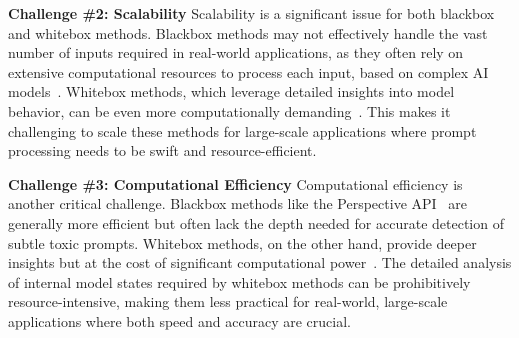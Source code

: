 



\textbf{Challenge \#2: Scalability} Scalability is a significant issue for both blackbox and whitebox methods. Blackbox methods may not effectively handle the vast number of inputs required in real-world applications, as they often rely on extensive computational resources to process each input, based on complex AI models~\cite{lees2022new, openai2022moderation}. Whitebox methods, which leverage detailed insights into model behavior, can be even more computationally demanding~\cite{huh2024platonic, jain2023baseline}. This makes it challenging to scale these methods for large-scale applications where prompt processing needs to be swift and resource-efficient.

\textbf{Challenge \#3: Computational Efficiency} Computational efficiency is another critical challenge. Blackbox methods like the Perspective API~\cite{lees2022new} are generally more efficient but often lack the depth needed for accurate detection of subtle toxic prompts. Whitebox methods, on the other hand, provide deeper insights but at the cost of significant computational power~\cite{huh2024platonic, jain2023baseline}. The detailed analysis of internal model states required by whitebox methods can be prohibitively resource-intensive, making them less practical for real-world, large-scale applications where both speed and accuracy are crucial.


